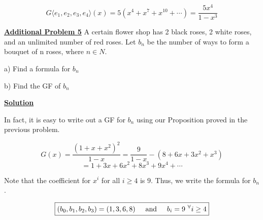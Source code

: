 \documentclass{article}
\newcommand{\new}[1]{
    \vspace{2mm}
    \noindent
    \textbf{
    \underline{#1}}
}
\newcommand{\textAnd}{
    {
        \hspace{5mm}
        \textrm{and}
        \hspace{5mm}
    }
}
\begin{document}
\[
    G\langle e_1, e_2, e_3, e_4\rangle (x) 
    = 
    5(x^4 + x^7 + x^{10} + \cdots) = \frac{5x^4}{1-x^3}
\]

\new{Additional Problem 5} A certain flower shop has 2 black roses, 2 white
roses, and an unlimited number of red roses. Let $b_n$ be the number of
ways to form a bouquet of n roses, where $n \in N$.

a) Find a formula for $b_n$

b) Find the GF of $b_n$

\new{Solution}
In fact, it is easy to write out a GF for $b_n$ using 
our Proposition proved in the previous problem. 

\[
    \boxed{
    G(x) = \frac {(1 + x + x^2)^2} {1 - x}    
    }
    = 
    \frac 9 {1-x} - (8 + 6x + 3x^2 + x^3)
\]
\[
    = 1 + 3x + 6x^2 + 8x^3 + 9x^4 + \cdots
\]

Note that the coefficient for $x^i$ for all $i \geq 4$ 
is $9$. Thus, we write the formula for $b_n$. 

\[
    \boxed{
    (b_0, b_1, b_2, b_3) = (1, 3, 6, 8)
    \textAnd 
    b_i = 9 \textrm{  }^\forall i \geq 4
    }
\]
\end{document}
